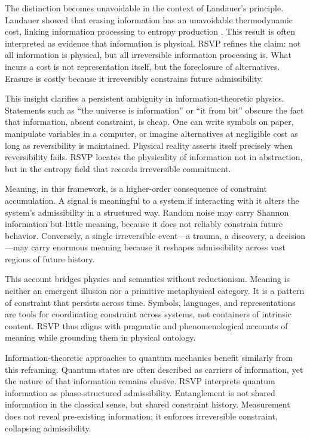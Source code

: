 \documentclass[11pt,oneside]{book}
\begin{document}
The distinction becomes unavoidable in the context of Landauer’s principle. Landauer showed that erasing information has an unavoidable thermodynamic cost, linking information processing to entropy production \cite{landauer1961}. This result is often interpreted as evidence that information is physical. RSVP refines the claim: not all information is physical, but all irreversible information processing is. What incurs a cost is not representation itself, but the foreclosure of alternatives. Erasure is costly because it irreversibly constrains future admissibility.

This insight clarifies a persistent ambiguity in information-theoretic physics. Statements such as “the universe is information” or “it from bit” obscure the fact that information, absent constraint, is cheap. One can write symbols on paper, manipulate variables in a computer, or imagine alternatives at negligible cost as long as reversibility is maintained. Physical reality asserts itself precisely when reversibility fails. RSVP locates the physicality of information not in abstraction, but in the entropy field that records irreversible commitment.

Meaning, in this framework, is a higher-order consequence of constraint accumulation. A signal is meaningful to a system if interacting with it alters the system’s admissibility in a structured way. Random noise may carry Shannon information but little meaning, because it does not reliably constrain future behavior. Conversely, a single irreversible event—a trauma, a discovery, a decision—may carry enormous meaning because it reshapes admissibility across vast regions of future history.

This account bridges physics and semantics without reductionism. Meaning is neither an emergent illusion nor a primitive metaphysical category. It is a pattern of constraint that persists across time. Symbols, languages, and representations are tools for coordinating constraint across systems, not containers of intrinsic content. RSVP thus aligns with pragmatic and phenomenological accounts of meaning while grounding them in physical ontology.

Information-theoretic approaches to quantum mechanics benefit similarly from this reframing. Quantum states are often described as carriers of information, yet the nature of that information remains elusive. RSVP interprets quantum information as phase-structured admissibility. Entanglement is not shared information in the classical sense, but shared constraint history. Measurement does not reveal pre-existing information; it enforces irreversible constraint, collapsing admissibility.
\end{document}
